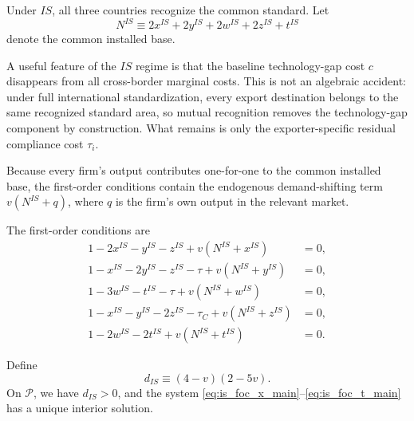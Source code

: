 Under $IS$, all three countries recognize the common standard. Let
\[
N^{IS}\equiv 2x^{IS}+2y^{IS}+2w^{IS}+2z^{IS}+t^{IS}
\]
denote the common installed base.

A useful feature of the $IS$ regime is that the baseline technology-gap cost
$c$ disappears from all cross-border marginal costs. This is not an algebraic
accident: under full international standardization, every export destination
belongs to the same recognized standard area, so mutual recognition removes the
technology-gap component by construction. What remains is only the
exporter-specific residual compliance cost $\tau_i$.

Because every firm's output contributes one-for-one to the common installed base, the first-order conditions contain the endogenous demand-shifting term $v(N^{IS}+q)$, where $q$ is the firm's own output in the relevant market.

The first-order conditions are
\begin{align}
1-2x^{IS}-y^{IS}-z^{IS}+v(N^{IS}+x^{IS}) &=0, \label{eq:is_foc_x_main}\\
1-x^{IS}-2y^{IS}-z^{IS}-\tau+v(N^{IS}+y^{IS}) &=0, \label{eq:is_foc_y_main}\\
1-3w^{IS}-t^{IS}-\tau+v(N^{IS}+w^{IS}) &=0, \label{eq:is_foc_w_main}\\
1-x^{IS}-y^{IS}-2z^{IS}-\tau_C+v(N^{IS}+z^{IS}) &=0, \label{eq:is_foc_z_main}\\
1-2w^{IS}-2t^{IS}+v(N^{IS}+t^{IS}) &=0. \label{eq:is_foc_t_main}
\end{align}

Define
\[
d_{IS}\equiv (4-v)(2-5v).
\]
On $\mathcal P$, we have $d_{IS}>0$, and the system \eqref{eq:is_foc_x_main}--\eqref{eq:is_foc_t_main} has a unique interior solution.

